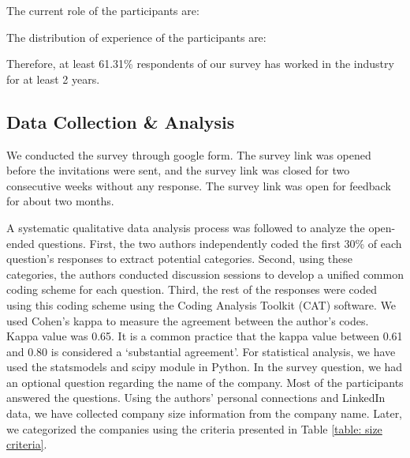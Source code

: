 The current role of the participants are: 


The distribution of experience of the participants are:


Therefore, at least 61.31\% respondents of our survey has worked in the industry for at least 2 years.



\subsection{Data Collection \& Analysis}
\label{survey_data_collection}

We conducted the survey through google form. The survey link was opened before the invitations were sent, and the survey link was closed for two consecutive weeks without any response. The survey link was open for feedback for about two months. 

A systematic qualitative data analysis process was followed to analyze the open-ended questions. First, the two authors independently coded the first 30\% of each question's responses to extract potential categories. Second, using these categories, the authors conducted discussion sessions to develop a unified common coding scheme for each question. Third, the rest of the responses were coded using this coding scheme using the Coding Analysis Toolkit (CAT)\cite{Lu2008} software. We used Cohen's kappa\cite{Cohen1960} to measure the agreement between the author's codes. Kappa value was 0.65. It is a common practice that the kappa value between 0.61 and 0.80\cite{Landis1977} is considered a `substantial agreement’. For statistical analysis, we have used the statsmodels\cite{seabold2010} and scipy\cite{scipy2020} module in Python. In the survey question, we had an optional question regarding the name of the company. Most of the participants answered the questions. Using the authors' personal connections and LinkedIn data, we have collected company size information from the company name. Later, we categorized the companies using the criteria presented in Table \ref{table: size criteria}.


 
